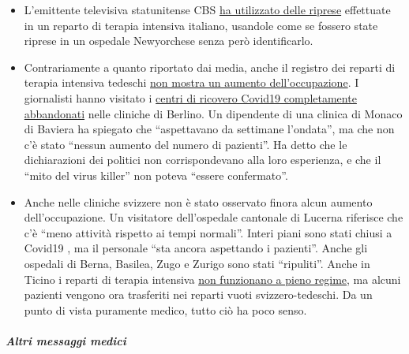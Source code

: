 \begin{itemize}
\tightlist
\item
  L'emittente televisiva statunitense CBS
  \href{https://nypost.com/2020/04/01/cbs-admits-to-using-footage-from-italy-in-report-about-nyc/}{ha
  utilizzato delle riprese} effettuate in un reparto di terapia
  intensiva italiano, usandole come se fossero state riprese in un
  ospedale Newyorchese senza però identificarlo.\\
\item
  Contrariamente a quanto riportato dai media, anche il registro dei
  reparti di terapia intensiva tedeschi
  \href{https://www.divi.de/register/intensivregister}{non mostra un
  aumento dell'occupazione}. I giornalisti hanno visitato i
  \href{https://www.in-opr.de/2020/03/28/coronakrise-und-ruppiner-kliniken-was-stimmt-hier-nicht/}{centri
  di ricovero Covid19 completamente abbandonati} nelle cliniche di
  Berlino. Un dipendente di una clinica di Monaco di Baviera ha spiegato
  che ``aspettavano da settimane l'ondata'', ma che non c'è stato
  ``nessun aumento del numero di pazienti''. Ha detto che le
  dichiarazioni dei politici non corrispondevano alla loro esperienza, e
  che il ``mito del virus killer'' non poteva ``essere confermato''.
\item
  Anche nelle cliniche svizzere non è stato osservato finora alcun
  aumento dell'occupazione. Un visitatore dell'ospedale cantonale di
  Lucerna riferisce che c'è ``meno attività rispetto ai tempi normali''.
  Interi piani sono stati chiusi a Covid19 , ma il personale ``sta
  ancora aspettando i pazienti''. Anche gli ospedali di Berna, Basilea,
  Zugo e Zurigo sono stati ``ripuliti''. Anche in Ticino i reparti di
  terapia intensiva
  \href{https://www.nzz.ch/schweiz/tessin-verlegt-erste-corona-patienten-in-deutschschweizer-spitaeler-ld.1549417}{non
  funzionano a pieno regime}, ma alcuni pazienti vengono ora trasferiti
  nei reparti vuoti svizzero-tedeschi. Da un punto di vista puramente
  medico, tutto ciò ha poco senso.
\end{itemize}

\hypertarget{altri-messaggi-medici}{%
\subparagraph{\texorpdfstring{\textbf{Altri messaggi
medici}}{Altri messaggi medici}}\label{altri-messaggi-medici}}

